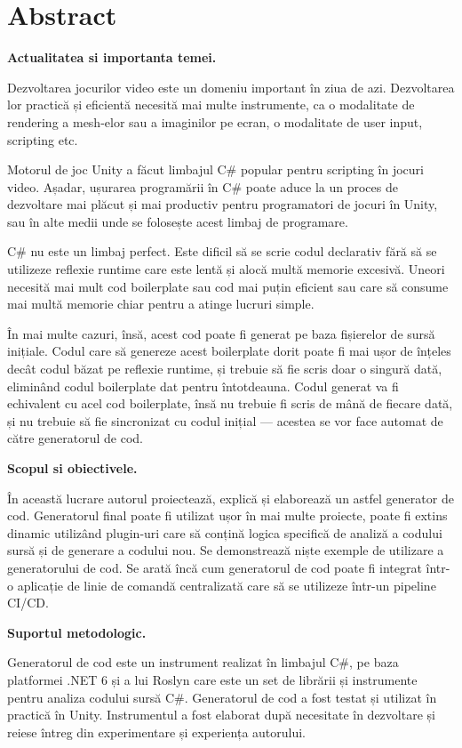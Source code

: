 \documentclass{report}
\begin{document}
\chapter*{Abstract}

\textbf{Actualitatea si importanta temei.}

Dezvoltarea jocurilor video este un domeniu important în ziua de azi.
Dezvoltarea lor practică și eficientă necesită mai multe instrumente, ca o modalitate de rendering a mesh-elor sau a imaginilor pe ecran, o modalitate de user input, scripting etc.

Motorul de joc Unity a făcut limbajul C# popular pentru scripting în jocuri video.
Așadar, ușurarea programării în C# poate aduce la un proces de dezvoltare mai plăcut și mai productiv pentru programatori de jocuri în Unity, sau în alte medii unde se folosește acest limbaj de programare.

C# nu este un limbaj perfect.
Este dificil să se scrie codul declarativ fără să se utilizeze reflexie runtime care este lentă și alocă multă memorie excesivă.
Uneori necesită mai mult cod boilerplate sau cod mai puțin eficient sau care să consume mai multă memorie chiar pentru a atinge lucruri simple.

În mai multe cazuri, însă, acest cod poate fi generat pe baza fișierelor de sursă inițiale.
Codul care să genereze acest boilerplate dorit poate fi mai ușor de înțeles decât codul băzat pe reflexie runtime, și trebuie să fie scris doar o singură dată, eliminând codul boilerplate dat pentru întotdeauna.
Codul generat va fi echivalent cu acel cod boilerplate, însă nu trebuie fi scris de mână de fiecare dată, și nu trebuie să fie sincronizat cu codul inițial — acestea se vor face automat de către generatorul de cod.


\textbf{Scopul si obiectivele.}

În această lucrare autorul proiectează, explică și elaborează un astfel generator de cod.
Generatorul final poate fi utilizat ușor în mai multe proiecte, poate fi extins dinamic utilizând plugin-uri care să conțină logica specifică de analiză a codului sursă și de generare a codului nou.
Se demonstrează niște exemple de utilizare a generatorului de cod.
Se arată încă cum generatorul de cod poate fi integrat într-o aplicație de linie de comandă centralizată care să se utilizeze într-un pipeline CI/CD.

\textbf{Suportul metodologic.}

Generatorul de cod este un instrument realizat în limbajul C#, pe baza platformei .NET 6 și a lui Roslyn care este un set de librării și instrumente pentru analiza codului sursă C#.
Generatorul de cod a fost testat și utilizat în practică în Unity.
Instrumentul a fost elaborat după necesitate în dezvoltare și reiese întreg din experimentare și experiența autorului.
\end{document}
